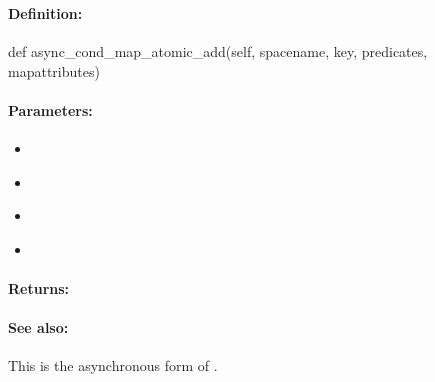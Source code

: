\pagebreak
\subsubsection{}
\label{api:python:async_cond_map_atomic_add}


\paragraph{Definition:}
\begin{pythoncode}
def async_cond_map_atomic_add(self, spacename, key, predicates, mapattributes)
\end{pythoncode}

\paragraph{Parameters:}
\begin{itemize}[noitemsep]
\item {}\\

\item {}\\

\item {}\\

\item {}\\

\end{itemize}

\paragraph{Returns:}


\paragraph{See also:}  This is the asynchronous form of .

\pagebreak
\subsubsection{}
\label{api:python:map_atomic_sub}


